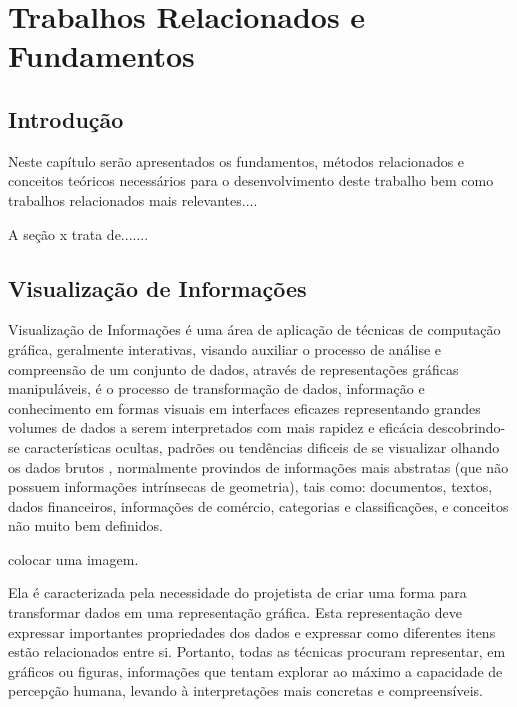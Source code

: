 \newcommand{\R}[1]{\ensuremath{\mathbb{R}^{#1}}}
\newcommand{\DB}{\ensuremath{\mathcal{D}}}


\chapter{Trabalhos Relacionados e Fundamentos}
\label{cap-trab-relacionados}

\section{Introdução}

Neste capítulo serão apresentados os fundamentos, métodos relacionados e conceitos teóricos necessários para o desenvolvimento deste trabalho bem como trabalhos relacionados mais relevantes....

A seção x trata de.......

\section{Visualização de Informações}

Visualização de Informações é uma área de aplicação de técnicas de computação gráfica, geralmente interativas, visando auxiliar o processo de análise e compreensão de um conjunto de dados, através de representações gráficas manipuláveis\cite{gershon1998information}, é o processo de transformação de dados, informação e conhecimento em formas visuais em interfaces eficazes representando grandes volumes de dados a serem interpretados com mais rapidez e eficácia  descobrindo-se características ocultas, padrões ou tendências dificeis de se visualizar olhando os dados brutos\cite{gershon1998information} , normalmente provindos de  informações mais abstratas (que não possuem informações intrínsecas de geometria), tais como: documentos, textos, dados financeiros, informações de comércio, categorias e classificações, e conceitos não muito bem definidos.\cite{vaz2004visualizacao}

colocar uma imagem.

Ela é caracterizada pela necessidade do projetista de criar uma forma para transformar dados em uma representação gráfica. Esta representação deve expressar importantes propriedades dos dados e expressar como diferentes itens estão relacionados entre si. Portanto, todas as técnicas procuram representar, em gráficos ou figuras, informações que tentam explorar ao máximo a capacidade de percepção humana, levando à interpretações mais concretas e compreensíveis. \cite{vaz2004visualizacao}


